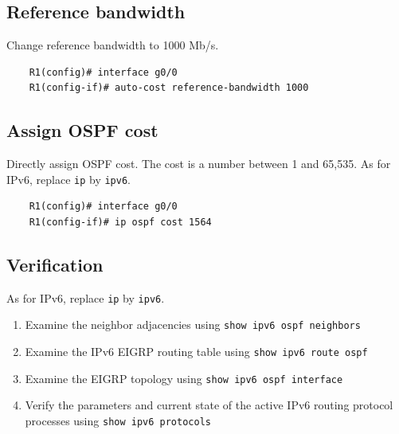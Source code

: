 \subsection{Reference bandwidth}	

Change reference bandwidth to 1000 Mb/s.
	\begin{verbatim}
	R1(config)# interface g0/0
	R1(config-if)# auto-cost reference-bandwidth 1000
	\end{verbatim}
	
\subsection{Assign OSPF cost}	

Directly assign OSPF cost. The cost is a number between 1 and 65,535. As for IPv6, replace \verb|ip| by \verb|ipv6|.
	\begin{verbatim}
	R1(config)# interface g0/0
	R1(config-if)# ip ospf cost 1564
	\end{verbatim}

\subsection{Verification}
As for IPv6, replace \verb|ip| by \verb|ipv6|.
\begin{enumerate} 
\item Examine the neighbor adjacencies using \verb|show ipv6 ospf neighbors|
\item Examine the IPv6 EIGRP routing table using \verb|show ipv6 route ospf|
\item Examine the EIGRP topology using \verb|show ipv6 ospf interface|
\item Verify the parameters and current state of the active IPv6 routing protocol processes using \verb|show ipv6 protocols|	
\end{enumerate}